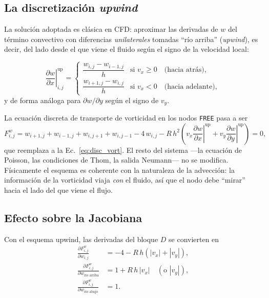 \documentclass[12pt, a4paper]{article}
\begin{document}
\subsection{La discretización \emph{upwind}}

La solución adoptada es clásica en CFD: aproximar las derivadas de $w$ del
término convectivo con diferencias \emph{unilaterales} tomadas ``río
arriba'' (\emph{upwind}), es decir, del lado desde el que viene el fluido
según el signo de la velocidad local:

\begin{ecbox}
  \begin{equation}
    \left.\frac{\partial w}{\partial x}\right|_{i,j}^{\text{up}} =
    \begin{cases}
      \dfrac{w_{i,j} - w_{i-1,j}}{h} & \text{si } v_x \geq 0
        \quad\text{(hacia atrás)},\\[10pt]
      \dfrac{w_{i+1,j} - w_{i,j}}{h} & \text{si } v_x < 0
        \quad\text{(hacia adelante)},
    \end{cases}
  \end{equation}
  y de forma análoga para $\partial w/\partial y$ según el signo de $v_y$.
\end{ecbox}

La ecuación discreta de transporte de vorticidad en los nodos \texttt{FREE}
pasa a ser
\begin{equation}
  F^{w}_{i,j}
  = w_{i+1,j} + w_{i-1,j} + w_{i,j+1} + w_{i,j-1} - 4\,w_{i,j}
  - R\,h^{2}\left(
      v_x \left.\frac{\partial w}{\partial x}\right|^{\text{up}}
    + v_y \left.\frac{\partial w}{\partial y}\right|^{\text{up}}
    \right) = 0,
  \label{eq:disc_vort_upwind}
\end{equation}
que reemplaza a la Ec.~\eqref{eq:disc_vort}. El resto del sistema —la
ecuación de Poisson, las condiciones de Thom, la salida Neumann— no se
modifica. Físicamente el esquema es coherente con la naturaleza de la
advección: la información de la vorticidad viaja \emph{con} el fluido, así
que el nodo debe ``mirar'' hacia el lado del que viene el flujo.

\subsection{Efecto sobre la Jacobiana}

Con el esquema upwind, las derivadas del bloque $D$ se convierten en
\begin{align}
  \frac{\partial F^{w}_{i,j}}{\partial w_{i,j}}
    &= -4 - R\,h\left(|v_x| + |v_y|\right),\\[4pt]
  \frac{\partial F^{w}_{i,j}}{\partial w_{\text{río arriba}}}
    &= 1 + R\,h\,|v_x| \quad(\text{o } |v_y|),\\[4pt]
  \frac{\partial F^{w}_{i,j}}{\partial w_{\text{río abajo}}}
    &= 1.
\end{align}
\end{document}
